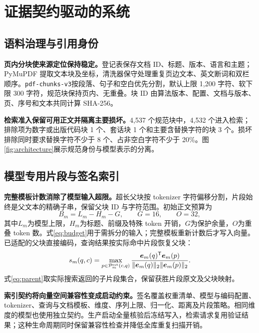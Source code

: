 \section{证据契约驱动的系统}

\subsection{语料治理与引用身份}
\textbf{页内分块使来源定位保持稳定。}登记表保存文档 ID、标题、版本、语言和主题；PyMuPDF 提取文本块及坐标，清洗器保守处理重复页边文本、英文断词和双栏顺序。\texttt{pdf-chunks-v3}按段落、句子和空白优先分割，默认上限 1,200 字符、软下限 300 字符，规范块保持页内、无重叠。块 ID 由算法版本、配置、文档与版本、页、序号和文本共同计算 SHA-256。

\textbf{检索准入保留可用正文并隔离主要损坏。}4,537 个规范块中，4,532 个进入检索；排除项为数字或出版代码块 1 个、套话块 1 个和主要含替换字符的块 3 个。损坏排除同时要求替换字符不少于 8 个、占非空白字符不少于 20\%。图\ref{fig:architecture}展示规范身份与模型表示的分离。


\subsection{模型专用片段与签名索引}
\textbf{完整模板计数消除了模型输入超限。}超长父块按 tokenizer 字符偏移分割，片段始终是父文本的精确子串，保留父块 ID 与字符范围。初始正文预算为
\begin{equation}
B_m=L_m-H_m-G,\qquad G=16,\qquad O=32,
\label{eq:budget}
\end{equation}
其中\(L_m\)为模型上限，\(H_m\)为标题、前缀及特殊 token 开销，\(G\)为保护余量，\(O\)为重叠 token 数。式\eqref{eq:budget}用于需拆分的输入；完整模板重新计数后才写入向量。已适配的父块直接编码，查询结果按实际命中片段恢复父块：
\begin{equation}
s_m(q,c)=\max_{p\in\mathcal P_m^{\rm ret}(c,q)}
\frac{\bm e_m(q)^{\mathsf T}\bm e_m(p)}{\|\bm e_m(q)\|_2\|\bm e_m(p)\|_2}.
\label{eq:parent}
\end{equation}
式\eqref{eq:parent}取实际搜索返回的子片段集合，保留获胜片段原文及父块映射。

\textbf{索引契约将向量空间兼容性变成启动约束。}签名覆盖权重清单、模型与编码配置、tokenizer、查询与文档模板、维度、序列上限、归一化、距离及片段策略。相同维度的模型也使用独立契约。生产启动全量核验后冻结写入，检索请求复用验证结果；这种生命周期同时保留兼容性检查并降低全库重复扫描开销。

